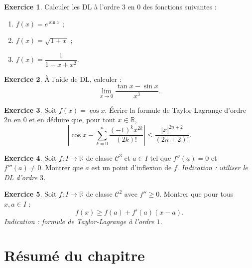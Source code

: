 \documentclass[12pt,a4paper,openany]{book}
\theoremstyle{definition}
\newtheorem{exercice}{Exercice}[chapter]
\newcommand{\R}{\mathbb{R}}
\begin{document}
\begin{exercice}\label{exo:DL-calcul}
Calculer les DL à l'ordre $3$ en $0$ des fonctions suivantes :
\begin{enumerate}[label=\textup{(\alph*)}]
  \item $f(x) = e^{\sin x}$ ;
  \item $f(x) = \sqrt{1 + x}$ ;
  \item $f(x) = \dfrac{1}{1 - x + x^2}$.
\end{enumerate}
\end{exercice}

\begin{exercice}\label{exo:DL-limite}
À l'aide de DL, calculer :
\[
  \lim_{x \to 0} \frac{\tan x - \sin x}{x^3}.
\]
\end{exercice}

\begin{exercice}\label{exo:taylor-reste}
Soit $f(x) = \cos x$. Écrire la formule de Taylor-Lagrange d'ordre $2n$ en $0$ et en déduire que, pour tout $x \in \R$,
\[
  \left|\cos x - \sum_{k=0}^{n} \frac{(-1)^k x^{2k}}{(2k)!}\right| \leqslant \frac{|x|^{2n+2}}{(2n+2)!}.
\]
\end{exercice}

\begin{exercice}\label{exo:point-inflexion}
Soit $f \colon I \to \R$ de classe $\mathcal{C}^3$ et $a \in I$ tel que $f''(a) = 0$ et $f'''(a) \neq 0$. Montrer que $a$ est un point d'inflexion de $f$.
\textit{Indication : utiliser le DL d'ordre $3$.}
\end{exercice}

\begin{exercice}\label{exo:inegalite-convexite}
Soit $f \colon I \to \R$ de classe $\mathcal{C}^2$ avec $f'' \geqslant 0$. Montrer que pour tous $x, a \in I$ :
\[
  f(x) \geqslant f(a) + f'(a)(x - a).
\]
\textit{Indication : formule de Taylor-Lagrange à l'ordre $1$.}
\end{exercice}

\section*{Résumé du chapitre~\thechapter}
\end{document}
